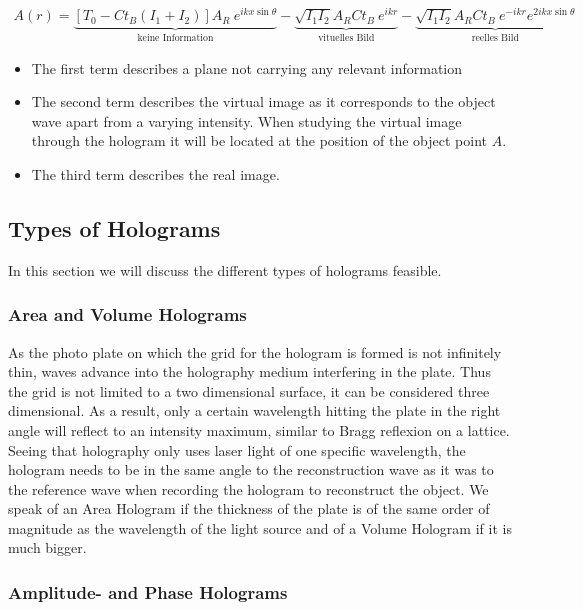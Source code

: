 \begin{align}
A(r)=\underbrace{[T_0-Ct_B(I_1+I_2)]A_R\ e^{ikx \sin\theta}}_{\mbox{keine Information}} - \underbrace{\sqrt{I_1I_2}A_RCt_B\ e^{ikr}}_{\mbox{vituelles Bild}} - \underbrace{\sqrt{I_1I_2}A_RCt_B\ e^{-ikr}e^{2ikx \sin\theta}}_{\mbox{reelles Bild}}
\end{align}



\begin{itemize}
	\item The first term describes a plane not carrying any relevant information
	\item The second term describes the virtual image as it corresponds to the object wave apart from a varying intensity. When studying the virtual image through the hologram it will be located at the position of the object point $A$.
	\item The third term describes the real image.
\end{itemize}

\subsection{Types of Holograms}

In this section we will discuss the different types of holograms feasible.

\subsubsection{Area and Volume Holograms}

As the photo plate on which the grid for the hologram is formed is not infinitely thin, waves advance into the holography medium interfering in the plate. Thus the grid is not limited to a two dimensional surface, it can be considered three dimensional. As a result, only a certain wavelength hitting the plate in the right angle will reflect to an intensity maximum, similar to Bragg reflexion on a lattice. Seeing that holography only uses laser light of one specific wavelength, the hologram needs to be in the same angle to the reconstruction wave as it was to the reference wave when recording the hologram to reconstruct the object.
We speak of an Area Hologram if the thickness of the plate is of the same order of magnitude as the  wavelength of the light source and of a Volume Hologram if it is much bigger.


\subsubsection{Amplitude- and Phase Holograms}

